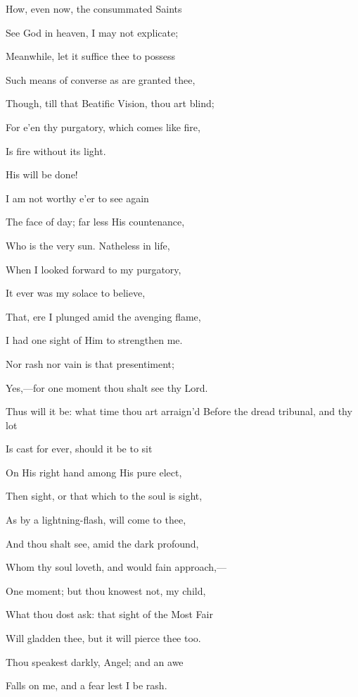 How, even now, the consummated Saints

See God in heaven, I may not explicate;

Meanwhile, let it suffice thee to possess

Such means of converse as are granted thee,

Though, till that Beatific Vision, thou art blind;

For e'en thy purgatory, which comes like fire,

Is fire without its light.


His will be done!

I am not worthy e'er to see again

The face of day; far less His countenance,

Who is the very sun. Natheless in life,

When I looked forward to my purgatory,

It ever was my solace to believe,

That, ere I plunged amid the avenging flame,

I had one sight of Him to strengthen me.


Nor rash nor vain is that presentiment;

Yes,—for one moment thou shalt see thy Lord.

Thus will it be: what time thou art arraign'd Before the dread tribunal, and thy lot

Is cast for ever, should it be to sit

On His right hand among His pure elect,

Then sight, or that which to the soul is sight,

As by a lightning-flash, will come to thee,

And thou shalt see, amid the dark profound,

Whom thy soul loveth, and would fain approach,—

One moment; but thou knowest not, my child,

What thou dost ask: that sight of the Most Fair

Will gladden thee, but it will pierce thee too.


Thou speakest darkly, Angel; and an awe

Falls on me, and a fear lest I be rash.

